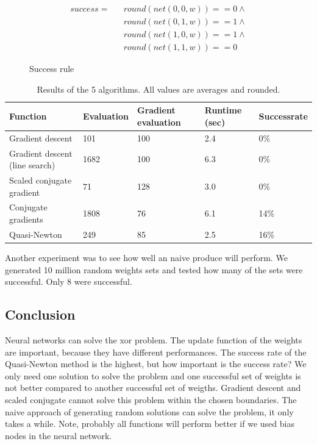 \documentclass{article}
\begin{document}
\begin{figure}[H]
	\centering
	\begin{eqnarray}
		success =&& round(net(0, 0, w)) == 0 \wedge \\
				&& round(net(0, 1, w)) == 1 \wedge \\
				&& round(net(1, 0, w)) == 1 \wedge \\
			&& round(net(1, 1, w)) == 0
	\end{eqnarray}
	\caption{Success rule}
	\label{fig:sr}
\end{figure}



\begin{table}[H]
	\centering
	\begin{tabular}{| l | l | l | l | l |}
		\hline
		Function & Evaluation & Gradient evaluation & Runtime (sec) & Successrate \\ \hline
		Gradient descent & 101 & 100 & 2.4 & 0\% \\ \hline
		Gradient descent (line search) & 1682 & 100 & 6.3 & 0\% \\ \hline
		Scaled conjugate gradient & 71 & 128 & 3.0 & 0\% \\ \hline
		Conjugate gradients & 1808 & 76 & 6.1 & 14\% \\ \hline
		Quasi-Newton & 249 & 85 & 2.5 & 16\% \\ \hline
	\end{tabular}
	\caption{Results of the 5 algorithms. All values are averages and rounded.}
	\label{table:results}
\end{table}

Another experiment was to see how well an naive produce will perform. We generated 10 million random weights sets and tested how many of the sets were successful. Only 8 were successful. 

\subsection{Conclusion}
Neural networks can solve the xor problem. The update function of the weights are important, because they have different performances. The success rate of the Quasi-Newton method is the highest, but how important is the success rate? We only need one solution to solve the problem and one successful set of weights is not better compared to another successful set of weigths. Gradient descent and scaled conjugate cannot solve this problem within the chosen boundaries. The naive approach of generating random solutions can solve the problem, it only takes a while. Note, probably all functions will perform better if we used bias nodes in the neural network.
\end{document}
